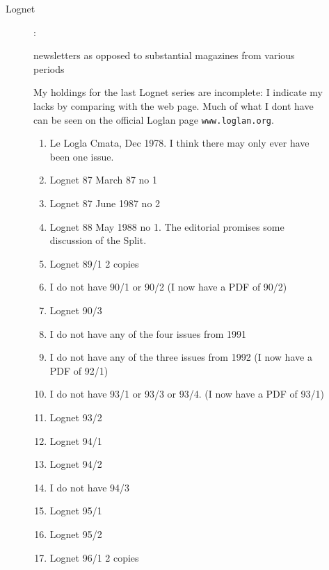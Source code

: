 \documentclass[12pt]{article}
\begin{document}
\begin{description}
\begin{description}
\begin{description}
\begin{enumerate}
\end{enumerate}

\end{description}

\item [Lognet]:

newsletters as opposed to substantial magazines from various periods

My holdings for the last Lognet series are incomplete:  I indicate my lacks by comparing with the web page.  Much of what I dont have can be seen on the official Loglan page {\tt www.loglan.org}.

\begin{enumerate}
\item  Le Logla Cmata, Dec 1978.  I think there may only ever have been one issue.
\item Lognet 87 March 87 no 1

\item Lognet 87 June 1987 no 2

\item Lognet 88 May 1988 no 1.  The editorial promises some discussion of the Split.

\item Lognet 89/1 2 copies

\item I do not have 90/1 or 90/2 (I now have a PDF of 90/2)

\item Lognet 90/3

\item I do not have any of the four issues from 1991

\item  I do not have any of the three issues from 1992 (I now have a PDF of 92/1)

\item I do not have 93/1 or 93/3 or 93/4. (I now have a PDF of 93/1)

\item Lognet 93/2

\item Lognet 94/1

\item Lognet 94/2

\item I do not have 94/3

\item Lognet 95/1
\item Lognet 95/2

\item Lognet 96/1 2 copies


\end{enumerate}
\end{description}
\end{description}
\end{document}
